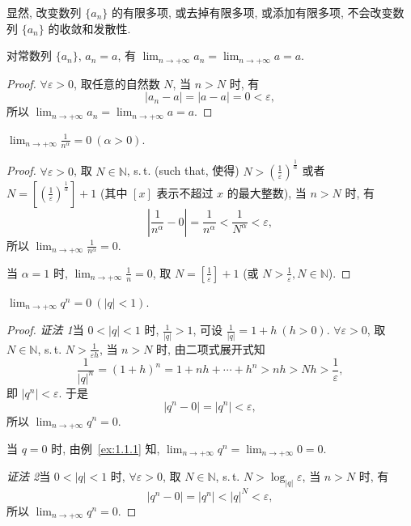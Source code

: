 显然, 改变数列 $\{a_{n}\}$ 的有限多项, 或去掉有限多项, 或添加有限多项, 不会改变数列 $\{a_{n}\}$ 的收敛和发散性.

\begin{example}\label{ex:1.1.1}
对常数列 $\{a_{n}\}$, $a_{n} = a$, 有 $\lim_{n \to +\infty} a_{n} = \lim_{n \to +\infty} a = a$.
\end{example}
\begin{proof}
$\forall\varepsilon>0$, 取任意的自然数 $N$, 当 $n>N$ 时, 有
\[
  |a_{n}-a|=|a-a|=0<\varepsilon,
\]
所以 $\lim_{n\to+\infty}a_n=\lim_{n\to+\infty}a=a$.
\end{proof}

\begin{example}\label{ex:1.1.2}
$\lim_{n\to+\infty}\frac{1}{n^\alpha}=0\ (\alpha>0)$.
\end{example}
\begin{proof}
$\forall\varepsilon>0$, 取 $N\in\mathbb{N}$, s.\,t. (such that, 使得) $N>\left(\frac{1}{\varepsilon}\right)^{\frac{1}{\alpha}}$ 或者 $N=\left[\left(\frac{1}{\varepsilon}\right)^{\frac{1}{\alpha}}\right]+1$ (其中 $[x]$ 表示不超过 $x$ 的最大整数), 当 $n>N$ 时, 有
\[
  \left|\frac{1}{n^{\alpha}}-0\right|=\frac{1}{n^{\alpha}}<\frac{1}{N^{\alpha}}<\varepsilon,
\]
所以 $\lim_{n\to+\infty}\frac{1}{n^{\alpha}}=0$.

当 $\alpha=1$ 时, $\lim_{n\to+\infty}\frac{1}{n}=0$, 取 $N=\left[\frac{1}{\varepsilon}\right]+1$ (或 $N>\frac{1}{\varepsilon}, N\in\mathbb{N}$).
\end{proof}

\begin{example}\label{ex:1.1.3}
$\lim_{n\to+\infty}q^n=0\ (|q|<1)$.
\end{example}
\begin{proof}
\textit{证法 1}\quad 当 $0<|q|<1$ 时, $\frac{1}{|q|}>1$, 可设 $\frac{1}{|q|}=1+h\ (h>0)$. $\forall\varepsilon>0$, 取 $N\in\mathbb{N}$, s.\,t. $N>\frac{1}{\varepsilon h}$, 当 $n>N$ 时, 由二项式展开式知
\[
  \frac{1}{|q|^n}=(1+h)^n = 1+nh+\cdots+h^n > nh > Nh > \frac{1}{\varepsilon},
\]
即 $|q^n| < \varepsilon$. 于是
\[
  |q^n-0|=|q^n|<\varepsilon,
\]
所以 $\lim_{n\to+\infty}q^{n}=0$.

当 $q=0$ 时, 由例~\ref{ex:1.1.1} 知, $\lim_{n\to+\infty}q^{n}=\lim_{n\to+\infty}0=0$.

\textit{证法 2}\quad 当 $0<|q|<1$ 时, $\forall\varepsilon>0$, 取 $N\in\mathbb{N}$, s.\,t. $N>\log_{|q|}\varepsilon$, 当 $n>N$ 时, 有
\[
  |q^{n}-0|=|q^{n}|<|q|^{N}<\varepsilon,
\]
所以 $\lim_{n\to+\infty}q^n=0$.
\end{proof}

